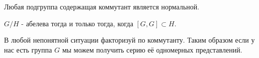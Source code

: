 \begin{ass}
Любая подгруппа содержащая коммутант является нормальной.
\end{ass}

\begin{ass}
$G/H$ - абелева тогда и только тогда, когда $[G,G]\subset H$.
\end{ass}

\begin{remark}
В любой непонятной ситуации факторизуй по коммутанту. Таким образом если у нас есть группа $G$ мы можем получить серию её одномерных представлений.
\end{remark}
